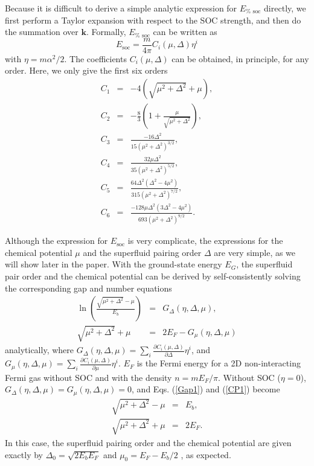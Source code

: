 \documentclass[pra,print,showpacs,superscriptaddress,twocolumn]{revtex4}
\begin{document}
Because it is difficult to derive a simple analytic expression for $E_{\text{%
soc}}$ directly, we first perform a Taylor expansion with respect to the SOC
strength, and then do the summation over $\mathbf{k}$. Formally, $E_{\text{%
soc}}$ can be written as%
\begin{equation}
E_{\text{soc}}=\frac{m}{4\pi }C_{i}(\mu ,\Delta )\eta ^{i}  \label{ESO}
\end{equation}%
with $\eta =m\alpha ^{2}/2$. The coefficients $C_{i}(\mu ,\Delta )$ can be
obtained, in principle, for any order. Here, we only give the first six
orders
\begin{eqnarray}
C_{1} &=&-4(\sqrt{\mu ^{2}+\Delta ^{2}}+\mu ),  \label{C1} \\
C_{2} &=&-\frac{8}{3}(1+\frac{\mu }{\sqrt{\mu ^{2}+\Delta ^{2}}}), \\
C_{3} &=&\frac{-16\Delta ^{2}}{15(\mu ^{2}+\Delta ^{2})^{3/2}}, \\
C_{4} &=&\frac{32\mu \Delta ^{2}}{35(\mu ^{2}+\Delta ^{2})^{5/2}}, \\
C_{5} &=&\frac{64\Delta ^{2}(\Delta ^{2}-4\mu ^{2})}{315(\mu ^{2}+\Delta
^{2})^{7/2}}, \\
C_{6} &=&\frac{-128\mu \Delta ^{2}(3\Delta ^{2}-4\mu ^{2})}{693(\mu
^{2}+\Delta ^{2})^{9/2}}.
\end{eqnarray}

Although the expression for $E_{\text{soc}}$ is very complicate, the
expressions for the chemical potential $\mu $ and the superfluid pairing
order $\Delta $ are very simple, as we will show later in the paper. With
the ground-state energy $E_{G}$, the superfluid pair order and the chemical
potential can be derived by self-consistently solving the corresponding gap
and number equations
\begin{eqnarray}
\ln (\frac{\sqrt{\mu ^{2}+\Delta ^{2}}-\mu }{E_{b}}) &=&G_{\Delta }(\eta
,\Delta ,\mu ),  \label{Gap1} \\
\sqrt{\mu ^{2}+\Delta ^{2}}+\mu &=&2E_{F}-G_{\mu }(\eta ,\Delta ,\mu )
\label{CP1}
\end{eqnarray}%
analytically, where $G_{\Delta }(\eta ,\Delta ,\mu )=\sum_{i}\frac{\partial
C_{i}(\mu ,\Delta )}{\partial \Delta }\eta ^{i}$, and $G_{\mu }(\eta ,\Delta
,\mu )=\sum_{i}\frac{\partial C_{i}(\mu ,\Delta )}{\partial \mu }\eta ^{i}$.
$E_{F}$ is the Fermi energy for a 2D non-interacting Fermi gas without SOC
and with the density $n=mE_{F}/\pi $. Without SOC ($\eta =0$), $G_{\Delta
}(\eta ,\Delta ,\mu )=G_{\mu }(\eta ,\Delta ,\mu )=0$, and Eqs. (\ref{Gap1})
and (\ref{CP1}) become
\begin{eqnarray*}
\sqrt{\mu ^{2}+\Delta ^{2}}-\mu &=&E_{b}, \\
\sqrt{\mu ^{2}+\Delta ^{2}}+\mu &=&2E_{F}.
\end{eqnarray*}%
In this case, the superfluid pairing order and the chemical potential are
given exactly by $\Delta _{0}=\sqrt{2E_{b}E_{F}}$ and $\mu
_{0}=E_{F}-E_{b}/2 $ \cite{MR}, as expected.
\end{document}

